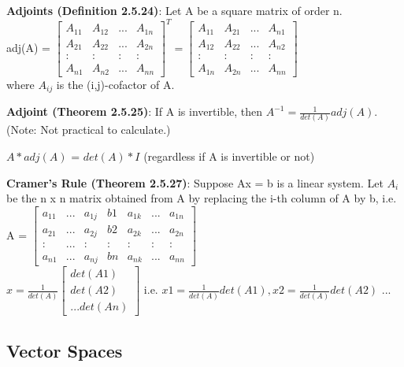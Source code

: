 \documentclass[a4paper,landscape]{article}
\newcommand{\rntopic}[1]{\vspace{-2.0em}\subsection*{#1}\vspace{-1.0em}}
\newcommand{\rnname}[1]{\textbf{#1}}
\begin{document}
\begin{multicols*}{4}
\begin{flatitemize}
\item \rnname{Adjoints (Definition 2.5.24)}: Let A be a square matrix of order n.\\
adj(A) = 
$\begin{bmatrix}
    A_{11} & A_{12} & ... & A_{1n} \\
    A_{21} & A_{22} & ... & A_{2n} \\
    : & : & : & : \\
    A_{n1} & A_{n2} & ... & A_{nn}
\end{bmatrix} ^T = 
\begin{bmatrix}
    A_{11} & A_{21} & ... & A_{n1} \\
    A_{12} & A_{22} & ... & A_{n2} \\
    : & : & : & : \\
    A_{1n} & A_{2n} & ... & A_{nn}
\end{bmatrix}
$\\where $A_{ij}$ is the (i,j)-cofactor of A. 
\item \rnname{Adjoint (Theorem 2.5.25)}: If A is invertible, then $A^{-1} = \frac{1}{det(A)} adj(A)$. (Note: Not practical to calculate.)
\item $A*adj(A)$ = $det(A)*I$ (regardless if A is invertible or not)
\item \rnname{Cramer's Rule (Theorem 2.5.27)}: Suppose Ax = b is a linear system. 
Let $A_{i}$ be the n x n matrix obtained from A by replacing the i-th column of A by b, i.e. A = $
\begin{bmatrix}
    a_{11} & ... & a_{1j} & b1 & a_{1k} & ... & a_{1n} \\
    a_{21} & ... & a_{2j} & b2 & a_{2k} & ... & a_{2n} \\
    :      & ... & :      & :  & :      & :   & : \\
    a_{n1} & ... & a_{nj} & bn & a_{nk} & ... & a_{nn}
\end{bmatrix}
$\\
$ x = \frac{1}{det(A)}
\begin{bmatrix}
	det(A1)\\
    det(A2)\\
    ...
    det(An)
\end{bmatrix}
$
i.e. $ x1 = \frac{1}{det(A)} det(A1), x2 = \frac{1}{det(A)} det(A2) $ ...
\end{flatitemize}

\rntopic{Vector Spaces}


\end{multicols*}
\end{document}
